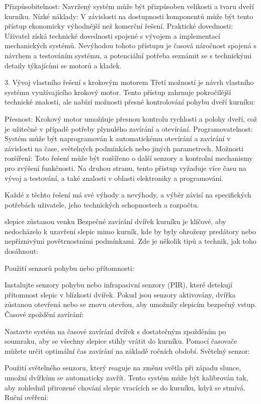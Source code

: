 Přizpůsobitelnost: Navržený systém může být přizpůsoben velikosti a tvaru dveří kurníku.
Nízké náklady: V závislosti na dostupnosti komponentů může být tento přístup ekonomicky výhodnější než komerční řešení.
Praktické dovednosti: Uživatel získá technické dovednosti spojené s vývojem a implementací mechanických systémů.
Nevýhodou tohoto přístupu je časová náročnost spojená s návrhem a testováním systému, a potenciální potřeba seznámit se s technickými detaily týkajícími se motorů a kladek.\newline

3. Vývoj vlastního řešení s krokovým motorem\newline
Třetí možností je návrh vlastního systému využívajícího krokový motor. Tento přístup zahrnuje pokročilější technické znalosti, ale nabízí možnosti přesné kontrolování pohybu dveří kurníku:

Přesnost: Krokový motor umožňuje přesnou kontrolu rychlosti a polohy dveří, což je užitečné v případě potřeby plynulého zavírání a otevírání.
Programovatelnost: Systém může být naprogramován k automatickému otevírání a zavírání v závislosti na čase, světelných podmínkách nebo jiných parametrech.
Možnosti rozšíření: Toto řešení může být rozšířeno o další senzory a kontrolní mechanismy pro zvýšení funkčnosti.
Na druhou stranu, tento přístup vyžaduje více času na vývoj a testování, a také znalosti v oblasti elektroniky a programování.

Každé z těchto řešení má své výhody a nevýhody, a výběr závisí na specifických potřebách uživatele, jeho technických schopnostech a rozpočtu.


slepice zůstanou venku
Bezpečné zavírání dvířek kurníku je klíčové, aby nedocházelo k uzavření slepic mimo kurník, kde by byly ohroženy predátory nebo nepříznivými povětrnostními podmínkami. Zde je několik tipů a technik, jak toho dosáhnout:

Použití senzorů pohybu nebo přítomnosti:

Instalujte senzory pohybu nebo infrapasivní senzory (PIR), které detekují přítomnost slepic v blízkosti dvířek. Pokud jsou senzory aktivovány, dvířka zůstanou otevřená nebo se znovu otevřou, aby umožnily slepicím bezpečný vstup.
Časové zpoždění zavírání:

Nastavte systém na časové zavírání dvířek s dostatečným zpožděním po soumraku, aby se všechny slepice stihly vrátit do kurníku. Pomocí časovače můžete určit optimální čas zavírání na základě ročních období.
Světelný senzor:

Použití světelného senzoru, který reaguje na změnu světla při západu slunce, umožní dvířkům se automaticky zavřít. Tento systém může být kalibrován tak, aby zohlednil přirozené chování slepic vracících se do kurníku, když se stmívá.
Ruční ověření:

